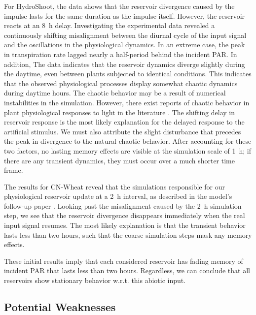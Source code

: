 \documentclass[10pt,a4paper,journal]{IEEEtran}
\begin{document}
For HydroShoot, the data shows that the reservoir divergence caused by the impulse lasts for the same duration as the impulse itself. 
However, the reservoir reacts at an \SI{8}{\hour} delay.
Investigating the experimental data revealed a continuously shifting misalignment between the diurnal cycle of the input signal and the oscillations in the physiological dynamics.
In an extreme case, the peak in transpiration rate lagged nearly a half-period behind the incident PAR.
In addition, The data indicates that the reservoir dynamics diverge slightly during the daytime, even between plants subjected to identical conditions.
This indicates that the observed physiological processes display somewhat chaotic dynamics during daytime hours.
The chaotic behavior may be a result of numerical instabilities in the simulation.
However, there exist reports of chaotic behavior in plant physiological responses to light in the literature \cite{shabala_observations_1997}.
The shifting delay in reservoir response is the most likely explanation for the delayed response to the artificial stimulus.
We must also attribute the slight disturbance that precedes the peak in divergence to the natural chaotic behavior.
After accounting for these two factors, no lasting memory effects are visible at the simulation scale of \SI{1}{\hour}; if there are any transient dynamics, they must occur over a much shorter time frame.


The results for CN-Wheat reveal that the simulations responsible for our physiological reservoir update at a \SI{2}{\hour} interval, as described in the model's follow-up paper \cite{barillot_cn-wheat_2016-1}. 
Looking past the misalignment caused by the \SI{2}{\hour} simulation step, we see that the reservoir divergence disappears immediately when the real input signal resumes.
The most likely explanation is that the transient behavior lasts less than two hours, such that the coarse simulation steps mask any memory effects.

These initial results imply that each considered reservoir has fading memory of incident PAR that lasts less than two hours.
Regardless, we can conclude that all reservoirs show stationary behavior w.r.t. this abiotic input.


\subsection{Potential Weaknesses}
\end{document}
